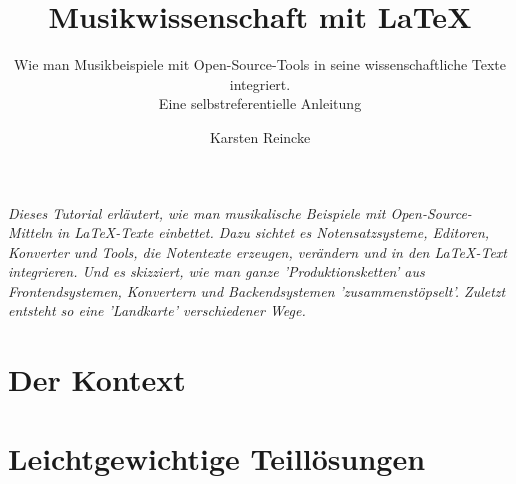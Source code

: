 \documentclass[
  DIV=calc,
  BCOR=5mm,
  12pt,
  headings=small,
  twoside,
  abstract=true,
  toc=bib,
  xcolor=dvipsnames,
  openany,
  english,ngerman]{scrbook}
\begin{document}
\nocite{*}

\titlehead{\textit{mycsrf} und Musik}
\subject{Release }
\title{Musikwissenschaft mit \LaTeX}
\subtitle{Wie man Musikbeispiele mit Open-Source-Tools in seine wissenschaftliche Texte integriert.\\ {\small Eine selbstreferentielle Anleitung}}
\author{Karsten Reincke}


\maketitle

\textit{Dieses Tutorial erläutert, wie man musikalische Beispiele mit Open-Source-Mitteln in \LaTeX-Texte einbettet. Dazu sichtet es Notensatzsysteme, Editoren, Konverter und Tools, die Notentexte erzeugen, verändern und in den \LaTeX-Text integrieren. Und es skizziert, wie man ganze 'Produktionsketten' aus Frontendsystemen, Konvertern und Backendsystemen 'zusammenstöpselt'. Zuletzt entsteht so eine 'Landkarte' verschiedener Wege.}

%




\footnotesize
\tableofcontents

\normalsize
\setcounter{chapter}{-1}
\chapter{Der Kontext}





\chapter{Leichtgewichtige Teillösungen}
\end{document}
